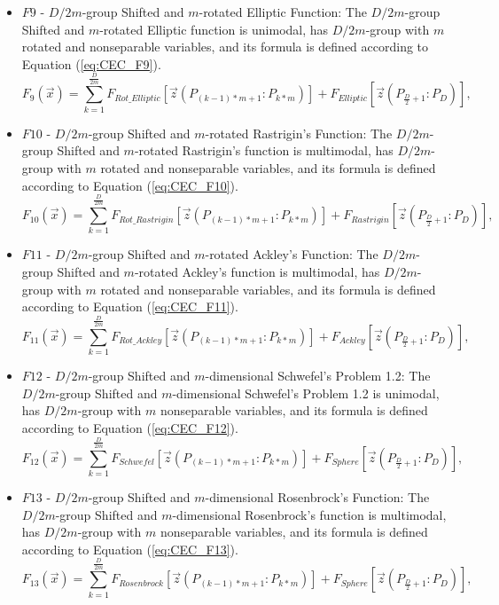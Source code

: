 \begin{itemize}
  \item $F9$ - $D/2m$-group Shifted and $m$-rotated Elliptic Function: The $D/2m$-group Shifted and $m$-rotated Elliptic function is unimodal, has $D/2m$-group with $m$ rotated and nonseparable variables, and its formula is defined according to Equation (\ref{eq:CEC_F9}).
      \begin{equation}\label{eq:CEC_F9}
            F_9(\vec{x}) = \sum_{k=1}^{\frac{D}{2m}}F_{Rot\_{Elliptic}}[\vec{z}(P_{(k-1) \ast m+1}:P_{k \ast m})] + F_{Elliptic}[\vec{z}(P_{\frac{D}{2}+1}:P_D)],
      \end{equation}
  \item $F10$ - $D/2m$-group Shifted and $m$-rotated Rastrigin's Function: The $D/2m$-group Shifted and $m$-rotated Rastrigin's function is multimodal, has $D/2m$-group with $m$ rotated and nonseparable variables, and its formula is defined according to Equation (\ref{eq:CEC_F10}).
      \begin{equation}\label{eq:CEC_F10}
            F_{10}(\vec{x}) = \sum_{k=1}^{\frac{D}{2m}}F_{Rot\_{Rastrigin}}[\vec{z}(P_{(k-1) \ast m+1}:P_{k \ast m})] + F_{Rastrigin}[\vec{z}(P_{\frac{D}{2}+1}:P_D)],
      \end{equation}
  \item $F11$ - $D/2m$-group Shifted and $m$-rotated Ackley's Function: The $D/2m$-group Shifted and $m$-rotated Ackley's function is multimodal, has $D/2m$-group with $m$ rotated and nonseparable variables, and its formula is defined according to Equation (\ref{eq:CEC_F11}).
      \begin{equation}\label{eq:CEC_F11}
            F_{11}(\vec{x}) = \sum_{k=1}^{\frac{D}{2m}}F_{Rot\_{Ackley}}[\vec{z}(P_{(k-1) \ast m+1}:P_{k \ast m})] + F_{Ackley}[\vec{z}(P_{\frac{D}{2}+1}:P_D)],
      \end{equation}
  \item $F12$ - $D/2m$-group Shifted and $m$-dimensional Schwefel's Problem 1.2: The $D/2m$-group Shifted and $m$-dimensional Schwefel's Problem 1.2 is unimodal, has $D/2m$-group with $m$ nonseparable variables, and its formula is defined according to Equation (\ref{eq:CEC_F12}).
      \begin{equation}\label{eq:CEC_F12}
            F_{12}(\vec{x}) = \sum_{k=1}^{\frac{D}{2m}}F_{Schwefel}[\vec{z}(P_{(k-1) \ast m+1}:P_{k \ast m})] + F_{Sphere}[\vec{z}(P_{\frac{D}{2}+1}:P_D)],
      \end{equation}
  \item $F13$ - $D/2m$-group Shifted and $m$-dimensional Rosenbrock's Function: The $D/2m$-group Shifted and $m$-dimensional Rosenbrock's function is multimodal, has $D/2m$-group with $m$ nonseparable variables, and its formula is defined according to Equation (\ref{eq:CEC_F13}).
      \begin{equation}\label{eq:CEC_F13}
            F_{13}(\vec{x}) = \sum_{k=1}^{\frac{D}{2m}}F_{Rosenbrock}[\vec{z}(P_{(k-1) \ast m+1}:P_{k \ast m})] + F_{Sphere}[\vec{z}(P_{\frac{D}{2}+1}:P_D)],
      \end{equation}
\end{itemize}

